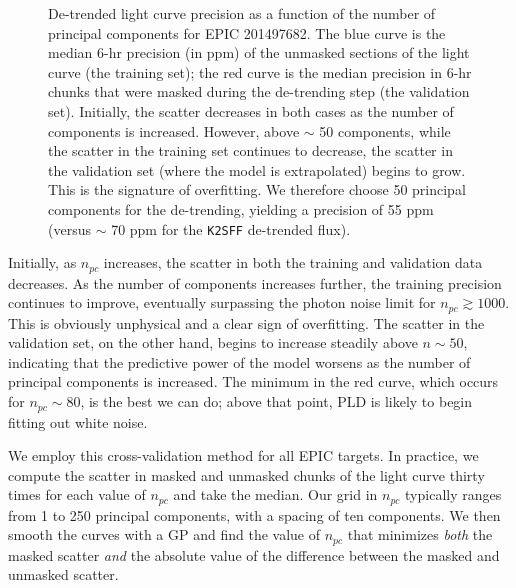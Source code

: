 \documentclass[]{emulateapj}
\begin{document}
\begin{figure}[h]
  \begin{center}
       \caption{De-trended light curve precision as a function of the number of principal
                components for EPIC 201497682. The blue curve is the median
                6-hr precision (in ppm) of the unmasked sections of the light curve (the training set); 
                the red curve is the median 
                precision in 6-hr chunks that were masked during the de-trending step
                (the validation set).
                Initially, the scatter decreases in both cases as the 
                number of components is increased. However, above $\sim$ 50 components, while the
                scatter in the training set continues to decrease, the scatter in the validation set (where 
                the model is extrapolated) begins to grow. This is the signature
                of overfitting. We therefore choose 50 principal components for the
                de-trending, yielding a precision of 55 ppm (versus $\sim$ 70 ppm for the
                \texttt{K2SFF} de-trended flux).}
     \label{fig:scatter}
  \end{center}
\end{figure}

Initially, as $n_{pc}$ increases, the scatter in both the training and validation data
decreases. As the number of components increases further, the training precision continues to improve,
eventually surpassing the photon noise limit for $n_{pc} \gtrsim 1000$. This is obviously unphysical and a
clear sign of overfitting. The scatter in the validation set, on the other hand, begins to increase steadily above $n \sim 50$,
indicating that the predictive power of the model worsens as the number of principal components is increased.
The minimum in the red curve, which occurs for $n_{pc} \sim 80$, is the best we can do; above that point, PLD
is likely to begin fitting out white noise.

We employ this cross-validation method for all EPIC targets. In practice, we compute the scatter in masked
and unmasked chunks of the light curve thirty times for each value of $n_{pc}$ and take the median. Our
grid in $n_{pc}$ typically ranges from 1 to 250 principal components, with a spacing of ten components.
We then smooth the curves with a GP and find the value of $n_{pc}$ that minimizes \emph{both} the masked scatter
\emph{and} the absolute value of the difference between the masked and unmasked scatter.
\end{document}
